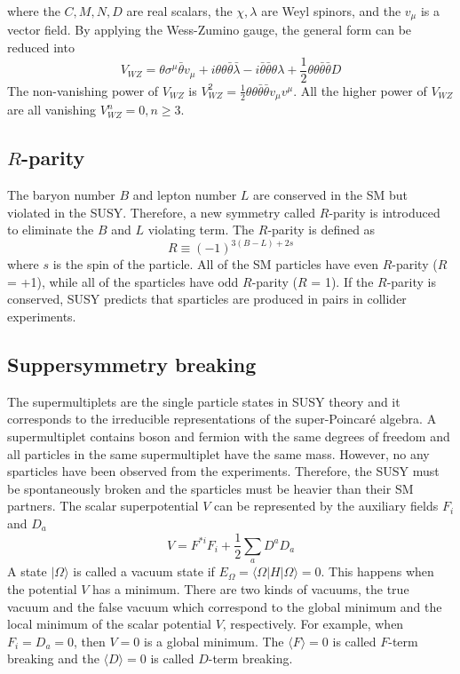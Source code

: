 %
where the $C, M, N, D$ are real scalars, the $\chi, \lambda$ are Weyl spinors, and the $v_{\mu}$ is a vector field.
By applying the Wess-Zumino gauge, the general form can be reduced into
%
\begin{equation}
V_{WZ} = \theta \sigma^{\mu} \bar{\theta} v_{\mu} + i \theta \theta \bar{\theta} \bar{\lambda} - i \bar{\theta} \bar{\theta} \theta \lambda + \frac{1}{2} \theta \theta \bar{\theta} \bar{\theta} D
\label{eq:susy_vector_superfield_reduced_form}
\end{equation}
%
The non-vanishing power of $V_{WZ}$ is $V^{2}_{WZ} = \frac{1}{2} \theta \theta \bar{\theta} \bar{\theta} v_{\mu} v^{\mu}$.
All the higher power of $V_{WZ}$ are all vanishing $V^{n}_{WZ} = 0, n \ge 3$.


\subsection{$R$-parity}
\label{subsec:susy_r_parity}
The baryon number $B$ and lepton number $L$ are conserved in the SM but violated in the SUSY.
Therefore, a new symmetry called $R$-parity is introduced to eliminate the $B$ and $L$ violating term.
The $R$-parity is defined as
%
\begin{equation}
R \equiv (-1)^{3(B-L)+2s}
\label{eq:susy_r_parity}
\end{equation}
%
where $s$ is the spin of the particle.
All of the SM particles have even $R$-parity ($R$ = +1), while all of the sparticles have odd $R$-parity ($R$ =  1). 
If the $R$-parity is conserved, SUSY predicts that sparticles are produced in pairs in collider experiments.


\subsection{Suppersymmetry breaking}
\label{sybsec:susy_soft_susy_breaking}
The supermultiplets are the single particle states in SUSY theory and it corresponds to the irreducible representations of the super-Poincar\'{e} algebra.
A supermultiplet contains boson and fermion with the same degrees of freedom and all particles in the same supermultiplet have the same mass.
However, no any sparticles have been observed from the experiments.
Therefore, the SUSY must be spontaneously broken and the sparticles must be heavier than their SM partners.
The scalar superpotential $V$ can be represented by the auxiliary fields $F_{i}$ and $D_{a}$
%
\begin{equation}
V = F^{*i}F_{i} + \frac{1}{2} \sum_{a} D^{a} D_{a}
\label{eq:susy_scalar_superpotential}
\end{equation}
%
A state $|\Omega \rangle$ is called a vacuum state if $E_{\Omega} = \langle \Omega | H | \Omega \rangle = 0$.
This happens when the potential $V$ has a minimum.
There are two kinds of vacuums, the true vacuum and the false vacuum which correspond to the global minimum and the local minimum of the scalar potential $V$, respectively.
For example, when $F_{i} = D_{a} = 0$, then $V = 0$ is a global minimum.
The $\langle F \rangle = 0$ is called $F$-term breaking and the $\langle D \rangle = 0$ is called $D$-term breaking.

